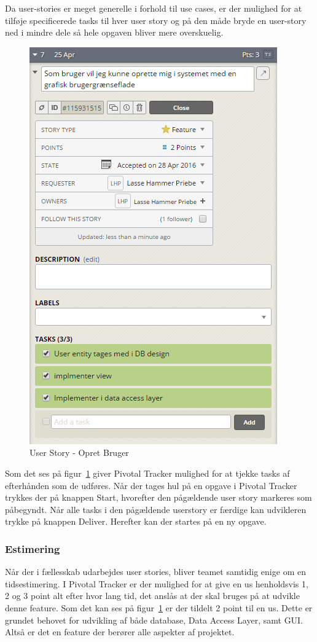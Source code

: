  Da user-stories er meget generelle i forhold til use cases, er der mulighed for at tilføje specificerede tasks til hver user story og på den måde bryde en user-story ned i mindre dele så hele opgaven bliver mere overskuelig.

\begin{figure}
	\centering
	\includegraphics[width=0.6\linewidth]{figs/processProjektGennemforsel/userstory_with_tasks.PNG}
	\caption{User Story - Opret Bruger}
	\label{fig:userstory_with_tasks}
\end{figure}

Som det ses på figur~\ref{fig:userstory_with_tasks} giver Pivotal Tracker mulighed for at tjekke tasks af efterhånden som de udføres. Når der tages hul på en opgave i Pivotal Tracker trykkes der på knappen Start, hvorefter den pågældende user story markeres som påbegyndt. Når alle tasks i den pågældende userstory er færdige kan udvikleren trykke på knappen Deliver. Herefter kan der startes på en ny opgave.

\subsubsection{Estimering}
Når der i fællesskab udarbejdes user stories, bliver teamet samtidig enige om en tidsestimering. I Pivotal Tracker er der mulighed for at give en \gls{us} henholdsvis 1, 2 og 3 point alt efter hvor lang tid, det anslås at der skal bruges på at udvikle denne feature.
Som det kan ses på figur~\ref{fig:userstory_with_tasks} er der tildelt 2 point til en \gls{us}. Dette er grundet behovet for udvikling af både database, Data Access Layer, samt GUI. Altså er det en feature der berører alle aspekter af projektet.

